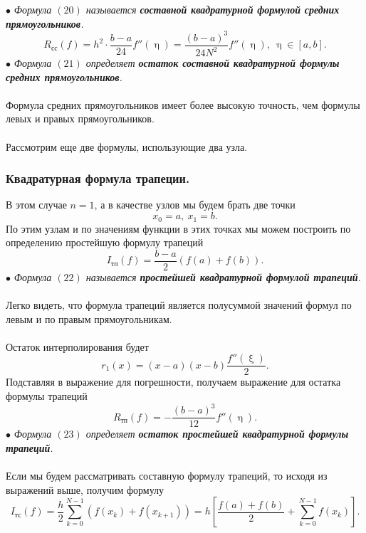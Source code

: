 \documentclass[a4paper, 12pt]{report}
\numberwithin{equation}{section}
\renewcommand{\eta}{\upeta}
\renewcommand{\xi}{\upxi}
\begin{document}
	 $\bullet$ \textit{Формула $(20)$ называется \textbf{составной квадратурной формулой средних прямоугольников}.}
	 \begin{equation}
	 	R_\text{сс}(f) = h^2\cdot \dfrac{b-a}{24} f''(\eta) = \dfrac{(b-a)^3}{24N^2}f''(\eta),\ \eta \in [a,b].
	 \end{equation}
	 $\bullet$ \textit{Формула $(21)$ определяет \textbf{остаток составной квадратурной формулы средних прямоугольников}.}\\\\
	 Формула средних прямоугольников имеет более высокую точность, чем формулы левых и правых прямоугольников.\\\\
	 Рассмотрим еще две формулы, использующие два узла.
	 \subsubsection{Квадратурная формула трапеции.}
	 В этом случае $n=1$, а в качестве узлов мы будем брать две точки $$x_0=a,\ x_1 = b.$$
	 По этим узлам и по значениям функции в этих точках мы можем построить по определению простейшую формулу трапеций 
	 \begin{equation}
	 	I_\text{тп} (f)= \dfrac{b-a}{2}\left(f(a) + f(b)\right).
	 \end{equation}
	 $\bullet$ \textit{Формула $(22)$ называется \textbf{простейшей квадратурной формулой трапеций}.}\\\\
	 Легко видеть, что формула трапеций является полусуммой значений формул по левым и по правым прямоугольникам.\\\\
	 Остаток интерполирования будет $$r_1(x) = (x-a)(x-b)\dfrac{f''(\xi)}{2}.$$
	 Подставляя в выражение для погрешности, получаем выражение для остатка формулы трапеций 
	 \begin{equation}
	 	R_\text{тп}(f) = -\dfrac{(b-a)^3}{12}f''(\eta).
	 \end{equation}
	 $\bullet$ \textit{Формула $(23)$ определяет \textbf{остаток простейшей квадратурной формулы трапеций}.}\\\\
	 Если мы будем рассматривать составную формулу трапеций, то исходя из выражений выше, получим формулу \begin{equation}
	 	I_\text{тс}(f) = \dfrac{h}{2}\sum_{k=0}^{N-1}(f(x_k) + f(x_{k+1})) = h\left[\dfrac{f(a)+f(b)}{2} + \sum_{k=0}^{N-1}f(x_k)\right].
	 \end{equation}
\end{document}
